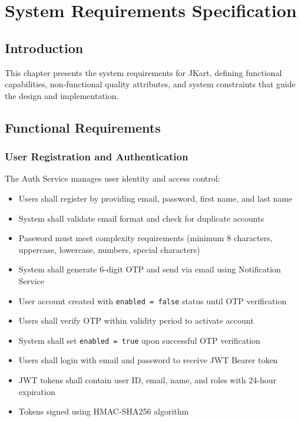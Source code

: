 \chapter{System Requirements Specification}

\section{Introduction}

This chapter presents the system requirements for JKart, defining functional capabilities, non-functional quality attributes, and system constraints that guide the design and implementation.

\section{Functional Requirements}

\subsection{User Registration and Authentication}

The Auth Service manages user identity and access control:

\begin{itemize}
    \item Users shall register by providing email, password, first name, and last name
    \item System shall validate email format and check for duplicate accounts
    \item Password must meet complexity requirements (minimum 8 characters, uppercase, lowercase, numbers, special characters)
    \item System shall generate 6-digit OTP and send via email using Notification Service
    \item User account created with \texttt{enabled = false} status until OTP verification
    \item Users shall verify OTP within validity period to activate account
    \item System shall set \texttt{enabled = true} upon successful OTP verification
    \item Users shall login with email and password to receive JWT Bearer token
    \item JWT tokens shall contain user ID, email, name, and roles with 24-hour expiration
    \item Tokens signed using HMAC-SHA256 algorithm
\end{itemize}

